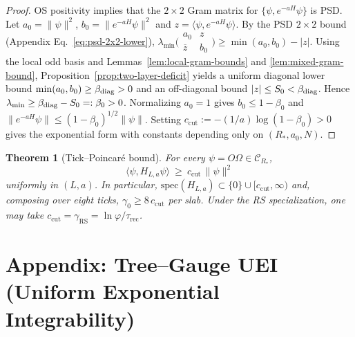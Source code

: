 \documentclass[11pt]{amsart}
\theoremstyle{plain}
\newtheorem{theorem}{Theorem}[section]
\theoremstyle{definition}
\theoremstyle{remark}
\begin{document}
\begin{proof}
OS positivity implies that the $2\times 2$ Gram matrix for $\{\psi, e^{-aH}\psi\}$ is PSD. Let $a_0=\|\psi\|^2$, $b_0=\|e^{-aH}\psi\|^2$ and $z=\langle\psi, e^{-aH}\psi\rangle$. By the PSD $2\times 2$ bound (Appendix Eq.~\eqref{eq:psd-2x2-lower}), $\lambda_{\min}\bigl(\begin{smallmatrix} a_0 & z \\ \overline z & b_0 \end{smallmatrix}\bigr)\ge \min(a_0,b_0)-|z|$. Using the local odd basis and Lemmas~\ref{lem:local-gram-bounds} and \ref{lem:mixed-gram-bound}, Proposition~\ref{prop:two-layer-deficit} yields a uniform diagonal lower bound $\min(a_0,b_0)\ge \beta_{\rm diag}>0$ and an off-diagonal bound $|z|\le S_0<\beta_{\rm diag}$. Hence $\lambda_{\min}\ge \beta_{\rm diag}-S_0=:\beta_0>0$. Normalizing $a_0=1$ gives $b_0\le 1-\beta_0$ and $\|e^{-aH}\psi\|\le (1-\beta_0)^{1/2}\|\psi\|$. Setting $c_{\mathrm{cut}}:=-(1/a)\log(1-\beta_0)>0$ gives the exponential form with constants depending only on $(R_*,a_0,N)$.
\end{proof}

\begin{theorem}[Tick--Poincar\'e bound]\label{thm:tp-bound}
For every $\psi=O\Omega\in\mathcal{C}_{R_*}$,
\[
  \langle\psi,H_{L,a}\psi\rangle\ \ge\ c_{\mathrm{cut}}\,\|\psi\|^2
\]
uniformly in $(L,a)$. In particular, $\mathrm{spec}(H_{L,a})\subset\{0\}\cup[c_{\mathrm{cut}},\infty)$ and, composing over eight ticks, $\gamma_0\ge 8\,c_{\mathrm{cut}}$ per slab. Under the RS specialization, one may take $c_{\mathrm{cut}}=\gamma_{\mathrm{RS}}=\ln\varphi/\tau_{\mathrm{rec}}$.
\end{theorem}

\section{Appendix: Tree--Gauge UEI (Uniform Exponential Integrability)}
\end{document}

